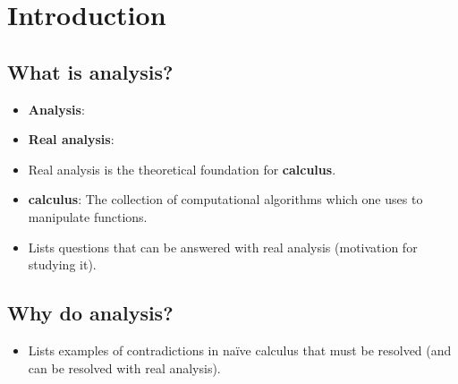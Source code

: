 \documentclass[../main.tex]{subfiles}
\begin{document}
\chapter{Introduction}
\section{What is analysis?}
\begin{itemize}
    \item {}\textbf{Analysis}: 
    \item \textbf{Real analysis}: 
    \item Real analysis is the theoretical foundation for \textbf{calculus}.
    \item \textbf{calculus}: The collection of computational algorithms which one uses to manipulate functions.
    \item Lists questions that can be answered with real analysis (motivation for studying it).
\end{itemize}



\section{Why do analysis?}
\begin{itemize}
    \item Lists examples of contradictions in na\"{i}ve calculus that must be resolved (and can be resolved with real analysis).
\end{itemize}
\end{document}
